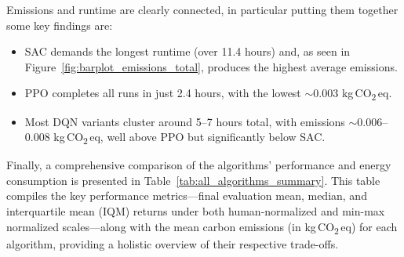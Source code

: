 Emissions and runtime are clearly connected, in particular putting them together some key findings are:
\begin{itemize}
	\item SAC demands the longest runtime (over 11.4 hours) and, as seen in 
	Figure~\ref{fig:barplot_emissions_total}, produces the highest average emissions. 
	\item PPO completes all runs in just 2.4 hours, with the lowest \(\sim0.003\) 
	kg\,CO\textsubscript{2}\,eq. 
	\item Most DQN variants cluster around 5--7 hours total, with emissions 
	\(\sim0.006\)--0.008 kg\,CO\textsubscript{2}\,eq, well above PPO but significantly below SAC.
\end{itemize}

Finally, a comprehensive comparison of the algorithms' performance and energy consumption is presented in Table~\ref{tab:all_algorithms_summary}. This table compiles the key performance metrics—final evaluation mean, median, and interquartile mean (IQM) returns under both human-normalized and min-max normalized scales—along with the mean carbon emissions (in kg\,CO\textsubscript{2}\,eq) for each algorithm, providing a holistic overview of their respective trade-offs.

\begin{table}
	\centering
	\caption{Final Evaluation Returns and Emissions for All Algorithms}
	\label{tab:all_algorithms_summary}
	\footnotesize %
\end{table}

